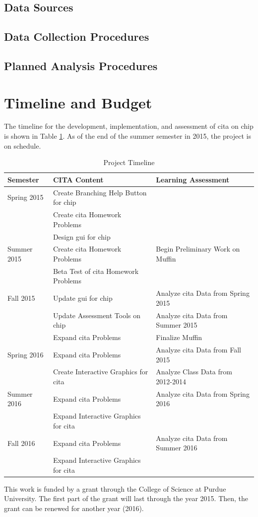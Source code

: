 \subsection{Data Sources}
\subsection{Data Collection Procedures}
\subsection{Planned Analysis Procedures}

\section{Timeline and Budget}

The timeline for the development, implementation, and assessment of \gls{cita} on \gls{chip} is shown in Table \ref{tab:timeline}. As of the end of the summer semester in 2015, the project is on schedule.

\pagebreak

\begin{landscape}
\begin{table}[!ht]
  \centering
  \begin{tabular}{|l|l|l|}
    \hline
    \textbf{Semester} & \textbf{CITA Content} & \textbf{Learning Assessment}\\
	\hline
	Spring 2015 & Create Branching Help Button for \gls{chip} & \\
	& Create \gls{cita} Homework Problems & \\
	& Design \gls{gui} for \gls{chip} & \\
	\hline
	Summer 2015 & Create \gls{cita} Homework Problems & Begin Preliminary Work on Muffin\\
	& Beta Test of \gls{cita} Homework Problems &  \\
	\hline
	Fall 2015 & Update \gls{gui} for \gls{chip} & Analyze \gls{cita} Data from Spring 2015 \\
	& Update Assessment Tools on \gls{chip} & Analyze \gls{cita} Data from Summer 2015 \\
	& Expand \gls{cita} Problems & Finalize Muffin \\
	\hline
	Spring 2016 & Expand \gls{cita} Problems & Analyze \gls{cita} Data from Fall 2015 \\
	& Create Interactive Graphics for \gls{cita} & Analyze Class Data from 2012-2014 \\
	\hline
	Summer 2016 & Expand \gls{cita} Problems & Analyze \gls{cita} Data from Spring 2016 \\
	& Expand Interactive Graphics for \gls{cita} & \\
	\hline
	Fall 2016 & Expand \gls{cita} Problems & Analyze \gls{cita} Data from Summer 2016 \\
	& Expand Interactive Graphics for \gls{cita} & \\
	\hline
  \end{tabular}
  \caption{Project Timeline}
  \label{tab:timeline}
\end{table}
\end{landscape}

\pagebreak

This work is funded by a grant through the College of Science at Purdue University. The first part of the grant will last through the year 2015. Then, the grant can be renewed for another year (2016).